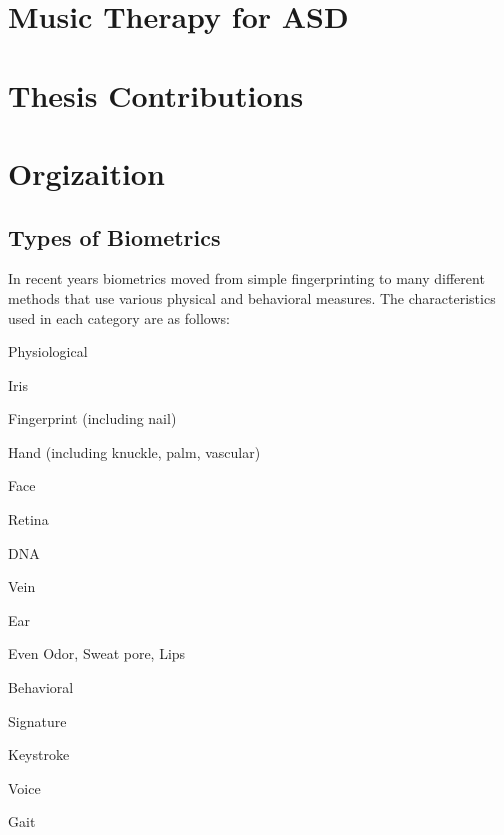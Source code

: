 \section{Music Therapy for ASD}

\section{Thesis Contributions}

\section{Orgizaition}





\subsection{Types of Biometrics} In recent years biometrics moved from simple fingerprinting to many different methods that use
various physical and behavioral measures. The characteristics used
in each category are as follows:

\bi \item Physiological
    \bi
        \item Iris
        \item Fingerprint (including nail)
        \item Hand (including knuckle, palm, vascular)
        \item Face
        \item Retina
        \item DNA
        \item Vein
        \item Ear
        \item Even Odor, Sweat pore, Lips
    \ei
\item Behavioral
    \bi
        \item Signature
        \item Keystroke
        \item Voice
        \item Gait
    \ei
\ei



